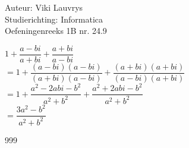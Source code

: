 \documentclass[a4paper]{article}
\begin{document}
  
\noindent \large Auteur: Viki Lauvrys        \\
\noindent \large Studierichting: Informatica \\
\noindent \large Oefeningenreeks 1B nr. 24.9 \\

\medskip

\normalsize

$ 1 + \dfrac{a - bi}{a + bi} + \dfrac{a + bi}{a - bi}$ \\

$ = 1 + \dfrac{(a - bi)(a - bi)}{(a + bi)(a - bi)} + \dfrac{(a + bi)(a + bi)}{(a - bi)(a + bi)}$ \\

$ = 1 + \dfrac{a^2 - 2abi - b^2}{a^2 + b^2} + \dfrac{a^2 + 2abi - b^2}{a^2 + b^2}$ \\

$ = \dfrac{3a^2 - b^2}{a^2 + b^2}$ \\

\begin{thebibliography}{999}
\end{thebibliography}
\end{document}
